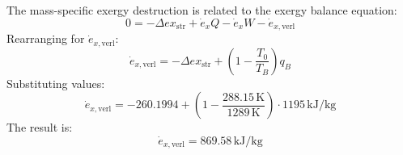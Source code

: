 The mass-specific exergy destruction is related to the exergy balance equation:  
\[
0 = -\Delta ex_{\text{str}} + \dot{e}_x Q - \dot{e}_x W - \dot{e}_{x,\text{verl}}
\]  
Rearranging for \(\dot{e}_{x,\text{verl}}\):  
\[
\dot{e}_{x,\text{verl}} = -\Delta ex_{\text{str}} + \left(1 - \frac{T_0}{T_B}\right) q_B
\]  
Substituting values:  
\[
\dot{e}_{x,\text{verl}} = -260.1994 + \left(1 - \frac{288.15 \, \text{K}}{1289 \, \text{K}}\right) \cdot 1195 \, \text{kJ/kg}
\]  
The result is:  
\[
\dot{e}_{x,\text{verl}} = 869.58 \, \text{kJ/kg}
\]